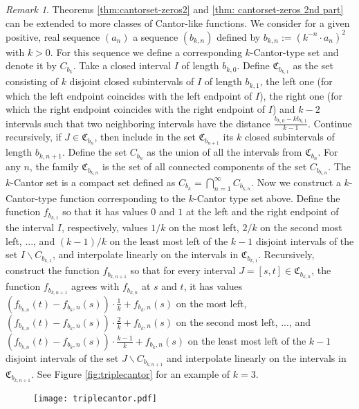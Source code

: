 \documentclass[11pt,reqno]{amsart}
\theoremstyle{plain}
\theoremstyle{definition}
\theoremstyle{remark}
\newtheorem{remark}[theorem]{Remark}
\begin{document}
\begin{remark}
Theorems \ref{thm:cantorset-zeros2} and \ref{thm: cantorset-zeros 2nd part} can be extended to more classes of Cantor-like functions. We consider for a given positive, real sequence $(a_n)$ a sequence $(b_{k,n})$ defined by $b_{k,n}:= (k^{-n} \cdot a_{n})^2$ with $k>0$. For this sequence we define a corresponding $k$-Cantor-type set and denote it by $C_{b_k}$.
Take a closed interval $I$ of length $b_{k,0}$. Define $\mathfrak{C}_{b_{k,1}}$ as the set consisting of $k$ disjoint closed subintervals of $I$ of length $b_{k,1}$, the left one (for which the left endpoint coincides with the left endpoint of $I$), the right one (for which the right endpoint coincides with the right endpoint of $I$) and $k-2$ intervals such that two neighboring intervals have the distance $\frac{b_{k,0} - kb_{k,1}}{k-1}$.
Continue recursively, if $J \in \mathfrak{C}_{b_{n}}$, then include in the set $\mathfrak{C}_{b_{n +1}}$ its $k$ closed subintervals of length $b_{k,n+1}$. Define the set $C_{b_{n}}$ as the union of all the intervals from $\mathfrak{C}_{b_{n}}$.
For any $n$, the family $\mathfrak{C}_{b_{k,n}}$ is the set of all connected components of the set $C_{b_{k,n}}$.
The $k$-Cantor set is a compact set defined as $C_{b_k}=\bigcap_{n=1}^\infty C_{b_{k,n}}$.
Now we construct a $k$-Cantor-type function corresponding to the $k$-Cantor type set above. Define the function $f_{b_{k,1}}$ so that it has values $0$ and $1$ at the left and the right endpoint of the interval $I$, respectively, values $1/k$ on the most left, $2/k$ on the second most left, ..., and $(k-1)/k$ on the least most left of the $k-1$ disjoint intervals of the set $I\backslash {C}_{b_{k,1}}$, and interpolate linearly on the intervals in $\mathfrak{C}_{b_{k,1}}$. Recursively, construct the function $f_{b_{k,n +1}}$ so that for every interval $J =[s,t]\in \mathfrak{C}_{b_{k,n}}$, the function $f_{b_{k,n +1}}$ agrees with $f_{b_{k,n}}$ at $s$ and $t$, it has values $(f_{b_{k,n}}(t)-f_{b_k,n}(s))\cdot\frac{1}{k} +f_{b_k,n}(s)$ on the most left, $(f_{b_{k,n}}(t)-f_{b_k,n}(s))\cdot\frac{2}{k} +f_{b_k,n}(s)$ on the second most left, ..., and $(f_{b_{k,n}}(t)-f_{b_k,n}(s))\cdot\frac{k-1}{k} +f_{b_k,n}(s)$ on the least most left of the $k-1$ disjoint intervals of the set $J \backslash C_{b_{k,n +1}}$ and interpolate linearly on the intervals in $\mathfrak{C}_{b_{k,n +1}}$. See Figure \ref{fig:triplecantor} for an example of $k=3$.

\begin{figure}
\texttt{[image: triplecantor.pdf]}


\end{figure}
\end{remark}
\end{document}
